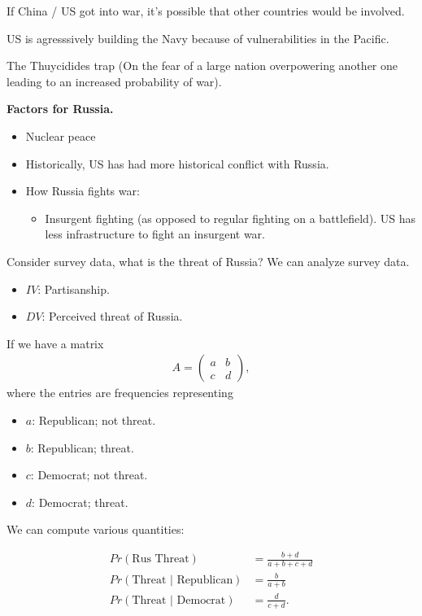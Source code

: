 \documentclass{article}
\newcommand{\mat}[1]{\begin{pmatrix}#1\end{pmatrix}}
\begin{document}
If China / US got into war, it's possible that other countries would be involved.

US is agresssively building the Navy because of vulnerabilities in the Pacific.

The Thuycidides trap (On the fear of a large nation overpowering another one leading to an increased probability of war).

{\bf Factors for Russia.}

\begin{itemize}
  \item Nuclear peace
  \item Historically, US has had more historical conflict with Russia.
  \item How Russia fights war:
    \begin{itemize}
      \item Insurgent fighting (as opposed to regular fighting on a battlefield).  US has less infrastructure to fight an insurgent war.
    \end{itemize}
\end{itemize}

Consider survey data, what is the threat of Russia?  We can analyze survey data.

\begin{itemize}
  \item $IV$: Partisanship.
  \item $DV$: Perceived threat of Russia.
\end{itemize}

If we have a matrix
\begin{align*}
  A = \mat{a & b \\ c & d},
\end{align*}
where the entries are frequencies representing
\begin{itemize}
  \item $a$: Republican; not threat.
  \item $b$: Republican; threat.
  \item $c$: Democrat; not threat.
  \item $d$: Democrat; threat.
\end{itemize}

We can compute various quantities:

\begin{align*}
  Pr(\text{Rus Threat}) &= \frac{b+d}{a+b+c+d} \\
  Pr(\text{Threat | Republican}) &= \frac{b}{a+b} \\
  Pr(\text{Threat | Democrat}) &= \frac{d}{c+d}.
\end{align*}
\end{document}

